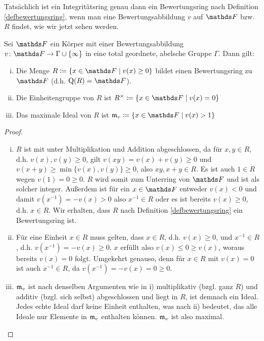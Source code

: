 \documentclass[ngerman,fontsize=11pt, paper=a4, parskip=half, titlepage=true, toc=bib]{scrartcl}
\begin{document}
Tatsächlich ist ein Integritätsring genau dann
ein Bewertungsring nach Definition \ref{defbewertungsring},
wenn man eine Bewertungsabbildung $v$ auf $\F$ bzw. $R$ findet,
wie wir jetzt sehen werden.

\begin{Lem}\label{bewertungsringausbewertung}
  Sei $\F$ ein Körper mit einer Bewertungsabbildung
  $v\colon\F\to\Gamma\cup\{\infty\}$ in eine total geordnete, abelsche Gruppe
  $\Gamma$. Dann gilt:
  \begin{enumerate}[i)]
  \item   Die Menge $R\coloneqq\left\{x\in \F\mid  v(x)\geq 0\right\}$ bildet
    einen Bewertungsring zu $\F$ (d.h. $\Quot(R)=\F$).
  \item Die Einheitengruppe von $R$ ist 
    $\Rx\coloneqq\left\{x\in\F\mid v(x)=0\right\}$
  \item Das maximale Ideal von $R$ ist
    $\frakm_v\coloneqq\left\{x\in\F\mid v(x)>1\right\}$
  \end{enumerate}

  \begin{proof}
    \begin{enumerate}[i)]
    \item $R$ ist mit unter Multiplikation und Addition abgeschlossen, da für
      $x,y\in R$, d.h. $v(x),v(y)\geq 0$, 
      gilt $v(xy)=v(x)+v(y)\geq 0$ und 
      $v(x+y)\geq \min\{v(x),v(y)\}\geq 0$, also $xy, x+y\in R$.
      Es ist auch $1\in R$ wegen $v(1)=0\geq 0$.
      $R$ wird somit  zum Unterring von $\F$ und ist als solcher integer.
      Außerdem ist für ein $x\in \F$ entweder $v(x)<0$
      und damit $v(x^{-1})=-v(x)>0$ also $x^{-1}\in R$ oder es ist
      bereits $v(x)\geq 0$, d.h. $x\in R$.
      Wir erhalten, dass $R$ nach Definition \ref{defbewertungsring}
      ein Bewertungsring ist.
    \item Für eine Einheit $x\in R$ muss gelten, dass $x\in R$,
      d.h. $v(x)\geq 0$, und $x^{-1}\in R$, d.h. $v(x^{-1})=-v(x)\geq 0$. 
      $x$ erfüllt also $v(x)\leq 0 \geq v(x)$, woraus bereits $v(x)=0$
      folgt.
      Umgekehrt genauso, denn für $x\in R$ mit $v(x)=0$ ist auch
      $x^{-1}\in R$, da $v(x^{-1})=-v(x)=0\geq 0$.
    \item $\mathfrak{m}_v$ ist nach denselben Argumenten wie in i)
      multiplikativ (bzgl. ganz $R$) und additiv (bzgl. sich selbst)
      abgeschlossen und liegt in $R$, ist demnach ein Ideal.
      Jedes echte Ideal darf keine Einheit enthalten, was nach ii) bedeutet,
      das alle Ideale nur Elemente in $\mathfrak{m}_v$ enthalten
      können. $\mathfrak{m}_v$ ist also maximal.
    \end{enumerate}
  \end{proof}
\end{Lem}
\end{document}
